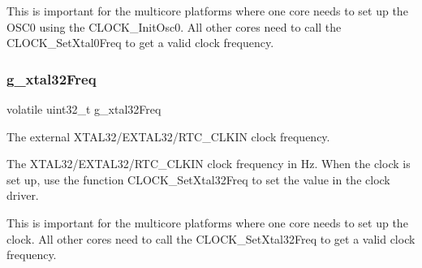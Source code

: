 This is important for the multicore platforms where one core needs to set up the O\+S\+C0 using the C\+L\+O\+C\+K\+\_\+\+Init\+Osc0. All other cores need to call the C\+L\+O\+C\+K\+\_\+\+Set\+Xtal0\+Freq to get a valid clock frequency. \mbox{\label{group__clock_ga170d2fd7c6b439b72e0f73b4d73443af}} 
\subsubsection{\texorpdfstring{g\_xtal32Freq}{g\_xtal32Freq}}
{\footnotesize\ttfamily volatile uint32\+\_\+t g\+\_\+xtal32\+Freq}



The external X\+T\+A\+L32/\+E\+X\+T\+A\+L32/\+R\+T\+C\+\_\+\+C\+L\+K\+IN clock frequency. 

The X\+T\+A\+L32/\+E\+X\+T\+A\+L32/\+R\+T\+C\+\_\+\+C\+L\+K\+IN clock frequency in Hz. When the clock is set up, use the function C\+L\+O\+C\+K\+\_\+\+Set\+Xtal32\+Freq to set the value in the clock driver.

This is important for the multicore platforms where one core needs to set up the clock. All other cores need to call the C\+L\+O\+C\+K\+\_\+\+Set\+Xtal32\+Freq to get a valid clock frequency. 